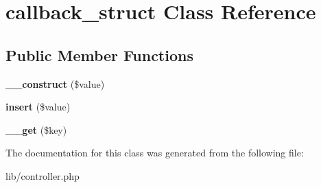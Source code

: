 \section{callback\_\-struct Class Reference}
\label{classcallback__struct}
\subsection*{Public Member Functions}
\begin{DoxyCompactItemize}
\item 
{\bfseries \_\-\_\-construct} (\$value)\label{classcallback__struct_a7e17a19b592345a03763f050fffe0ce7}

\item 
{\bfseries insert} (\$value)\label{classcallback__struct_a62cf320fe353f6eb1297d7d9ad7ea0fd}

\item 
{\bfseries \_\-\_\-get} (\$key)\label{classcallback__struct_a4537dad3b44254124991341cc91b28fb}

\end{DoxyCompactItemize}


The documentation for this class was generated from the following file:\begin{DoxyCompactItemize}
\item 
lib/controller.php\end{DoxyCompactItemize}
